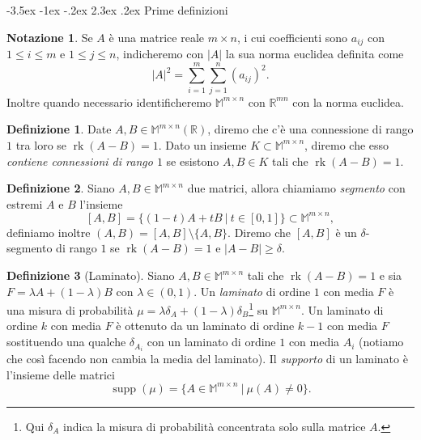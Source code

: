 \documentclass[a4paper,11pt]{book}
\makeatletter
\theoremstyle{plain}
\theoremstyle{definition}
\newtheorem{defn}{Definizione}[chapter]
\newtheorem*{notaz}{Notazione}
\theoremstyle{remark}
\newcommand{\R}{\mathbb{R}}
\newcommand{\M}{\mathbb{M}}
\DeclareMathOperator{\supp}{supp}
\DeclareMathOperator{\rk}{rk}
\renewcommand\section{\@startsection {section}{1}{\z@}%
                                   {-3.5ex \@plus -1ex \@minus -.2ex}%
                                   {2.3ex \@plus.2ex}%
                                   {\normalfont\Large\bfseries}}
\makeatother
\begin{document}
\section{Prime definizioni}
\begin{notaz}
	Se $A$ è una matrice reale $m\times n$, i cui coefficienti sono $a_{ij}$ con $1\leq i\leq m$ e $1\leq j\leq n$, indicheremo con $|A|$ la sua norma euclidea definita come 
	\[
		|A|^2 = \sum_{i=1}^m\sum_{j=1}^n (a_{ij})^2.
	\]
	Inoltre quando necessario identificheremo $\M^{m\times n}$ con $\R^{mn}$ con la norma euclidea.
\end{notaz}
\begin{defn}
	Date $A,B\in \M^{m\times n}(\R)$, diremo che c'è una connessione di rango $1$ tra loro se $\rk(A-B)=1$. Dato un insieme $K\subset\M^{m\times n}$, diremo che esso \textit{contiene connessioni di rango $1$} se esistono $A,B\in K$ tali che $\rk(A-B)=1$.
\end{defn}
\begin{defn}
	Siano $A,B\in\M^{m\times n}$ due matrici, allora chiamiamo \textit{segmento} con estremi $A$ e $B$ l'insieme
	\[
		[A,B]=\{(1-t)A+tB\ |\ t\in[0,1]\}\subset \M^{m\times n},
	\]
	definiamo inoltre $(A,B) = [A,B]\setminus\{A,B\}$. Diremo che $[A,B]$ è un $\delta$-segmento di rango $1$ se $\rk(A-B)=1$ e $|A-B|\geq \delta$.
\end{defn}
\begin{defn}[Laminato]\label{defn:4}
	Siano $A,B\in \M^{m\times n}$ tali che $\rk(A-B)=1$ e sia $F=\lambda A+(1-\lambda)B$ con $\lambda\in(0,1)$. Un \textit{laminato} di ordine $1$ con media $F$ è una misura di probabilità $\mu=\lambda \delta_A+(1-\lambda)\delta_B$\footnote{Qui $\delta_A$ indica la misura di probabilità concentrata solo sulla matrice $A$.} su $\M^{m\times n}$. Un laminato di ordine $k$ con media $F$ è ottenuto da un laminato di ordine $k-1$ con media $F$ sostituendo una qualche $\delta_{A_i}$ con un laminato di ordine $1$ con media $A_i$ (notiamo che così facendo non cambia la media del laminato). Il \textit{supporto} di un laminato è l'insieme delle matrici
	\[
		\supp(\mu)=\{A\in\M^{m\times n}\ |\ \mu(A)\neq 0 \}.
	\]
\end{defn}
\end{document}
